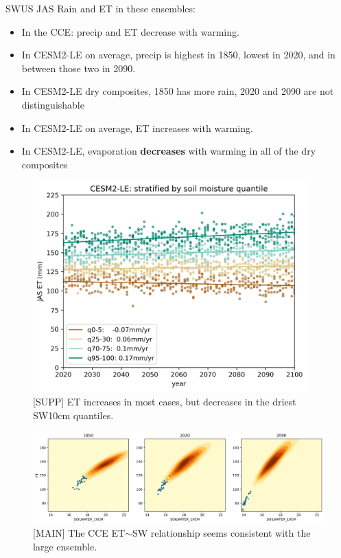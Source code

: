 \documentclass[11pt]{article}
\begin{document}
SWUS JAS Rain and ET in these ensembles:
\begin{itemize}
    \item In the CCE: precip and ET decrease with warming.
    \item In CESM2-LE on average, precip is highest in 1850, lowest in 2020, and in between those two in 2090.
    \item In CESM2-LE dry composites, 1850 has more rain, 2020 and 2090 are not distinguishable
    \item In CESM2-LE on average, ET increases with warming.
    \item In CESM2-LE, evaporation \textbf{decreases} with warming in all of the dry composites    
\end{itemize}


\begin{figure}[h]
\centering
\includegraphics[width=25pc]{figs/supp/et_trends.png}
\caption{[SUPP] ET increases in most cases, but decreases in the driest SW10cm quantiles.}
\label{fig:precip}
\end{figure}


\begin{figure}[h]
\centering
\includegraphics[width=40pc]{figs/contours/SOILWATER_10CM_ET_contours.png}
\caption{[MAIN] The CCE ET$\sim$SW relationship seems consistent with the large ensemble.}
\label{fig:precip}
\end{figure}
\end{document}
